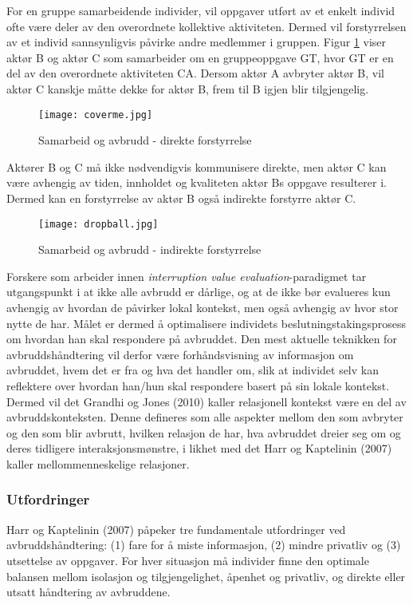 \noindent
For en gruppe samarbeidende individer, vil oppgaver utført av et enkelt individ ofte være deler av den overordnete kollektive aktiviteten. Dermed vil forstyrrelsen av et individ sannsynligvis påvirke andre medlemmer i gruppen. Figur \ref{direkte} viser aktør B og aktør C som samarbeider om en gruppeoppgave GT, hvor GT er en del av den overordnete aktiviteten CA. Dersom aktør A avbryter aktør B, vil aktør C kanskje måtte dekke for aktør B, frem til B igjen blir tilgjengelig.
\begin{figure}[H]
\centering
\texttt{[image: coverme.jpg]}
\caption{Samarbeid og avbrudd - direkte forstyrrelse}
\label{direkte}
\end{figure}

\noindent
Aktører B og C må ikke nødvendigvis kommunisere direkte, men aktør C kan være avhengig av tiden, innholdet og kvaliteten aktør Bs oppgave resulterer i. Dermed kan en forstyrrelse av aktør B også indirekte forstyrre aktør C.
\begin{figure}[H]
\centering
\texttt{[image: dropball.jpg]}
\caption{Samarbeid og avbrudd - indirekte forstyrrelse}
\label{indirekte}
\end{figure}

\noindent
Forskere som arbeider innen \emph{interruption value evaluation}-paradigmet tar utgangspunkt i at ikke alle avbrudd er dårlige, og at de ikke bør evalueres kun avhengig av hvordan de påvirker lokal kontekst, men også avhengig av hvor stor nytte de har. Målet er dermed å optimalisere individets beslutningstakingsprosess om hvordan han skal respondere på avbruddet. Den mest aktuelle teknikken for avbruddshåndtering vil derfor være forhåndsvisning av informasjon om avbruddet, hvem det er fra og hva det handler om, slik at individet selv kan reflektere over hvordan han/hun skal respondere basert på sin lokale kontekst. Dermed vil det Grandhi og Jones (2010) kaller relasjonell kontekst være en del av avbruddskonteksten. Denne defineres som alle aspekter mellom den som avbryter og den som blir avbrutt, hvilken relasjon de har, hva avbruddet dreier seg om og deres tidligere interaksjonsmønstre, i likhet med det Harr og Kaptelinin (2007) kaller mellommenneskelige relasjoner.

\subsubsection{Utfordringer}
Harr og Kaptelinin (2007) påpeker tre fundamentale utfordringer ved avbruddshåndtering: (1) fare for å miste informasjon, (2) mindre privatliv og (3) utsettelse av oppgaver. For hver situasjon må individer finne den optimale balansen mellom isolasjon og tilgjengelighet, åpenhet og privatliv, og direkte eller utsatt håndtering av avbruddene.